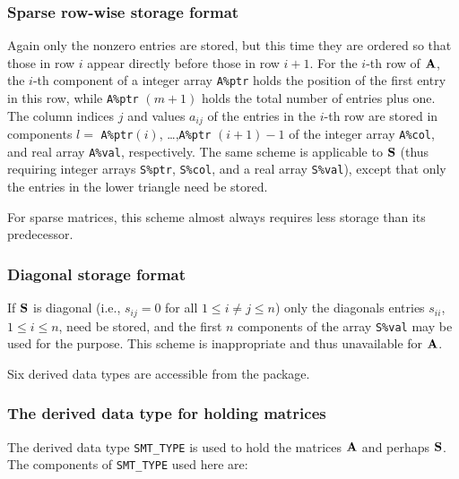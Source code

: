 \documentclass{galahad}
\begin{document}
\subsubsection{Sparse row-wise storage format}\label{rowwise}
Again only the nonzero entries are stored, but this time
they are ordered so that those in row $i$ appear directly before those
in row $i+1$. For the $i$-th row of ${\mathbf{A}}$, the $i$-th component of a
integer array {\tt A\%ptr} holds the position of the first entry in this row,
while {\tt A\%ptr} $(m+1)$ holds the total number of entries plus one.
The column indices $j$ and values $a_{ij}$ of the entries in the $i$-th row
are stored in components
$l =$ {\tt A\%ptr}$(i)$, \ldots ,{\tt A\%ptr} $(i+1)-1$ of the
integer array {\tt A\%col}, and real array {\tt A\%val}, respectively.
The same scheme is applicable to
${\mathbf{S}}$ (thus requiring integer arrays {\tt S\%ptr}, {\tt S\%col}, and
a real array {\tt S\%val}),
except that only the entries in the lower triangle need be stored.

For sparse matrices, this scheme almost always requires less storage than
its predecessor.

\subsubsection{Diagonal storage format}\label{diagonal}
If ${\mathbf{S}}$ is diagonal (i.e., $s_{ij} = 0$ for all $1 \leq i \neq j \leq n$)
only the diagonals entries $s_{ii}$, $1 \leq i \leq n$,  need be stored,
and the first $n$ components of the array {\tt S\%val} may be used for
the purpose. This scheme is inappropriate and thus unavailable for ${\mathbf{A}}$.








\galtypes
Six derived data types are accessible from the package.


\subsubsection{The derived data type for holding matrices}\label{typesmt}
The derived data type {\tt SMT\_TYPE} is used to hold the matrices ${\mathbf{A}}$
and perhaps ${\mathbf{S}}$.
The components of {\tt SMT\_TYPE} used here are:
\end{document}
